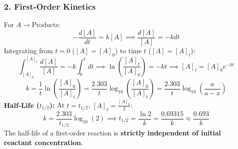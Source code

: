 \documentclass[10pt,a4paper]{article}
\begin{document}
\subsubsection{2. First-Order Kinetics}
For $A \to \text{Products}$:
\begin{equation}
  -\frac{d[A]}{dt} = k [A] \implies \frac{d[A]}{[A]} = -k dt
\end{equation}
Integrating from $t = 0$ ($[A] = [A]_0$) to time $t$ ($[A] = [A]_t$):
\begin{equation}
  \int_{[A]_0}^{[A]_t} \frac{d[A]}{[A]} = -k \int_0^t dt \implies \ln\left(\frac{[A]_t}{[A]_0}\right) = -kt \implies [A]_t = [A]_0 e^{-kt}
\end{equation}
\begin{equation}
  k = \frac{1}{t}\ln\left(\frac{[A]_0}{[A]_t}\right) = \frac{2.303}{t}\log_{10}\left(\frac{[A]_0}{[A]_t}\right) = \frac{2.303}{t}\log_{10}\left(\frac{a}{a - x}\right)
\end{equation}
\textbf{Half-Life ($t_{1/2}$):}
At $t = t_{1/2}$, $[A]_t = \frac{[A]_0}{2}$:
\begin{equation}
  k = \frac{2.303}{t_{1/2}}\log_{10}(2) \implies t_{1/2} = \frac{\ln 2}{k} = \frac{0.69315}{k} \approx \frac{0.693}{k}
\end{equation}
The half-life of a first-order reaction is \textbf{strictly independent of initial reactant concentration}.
\end{document}
